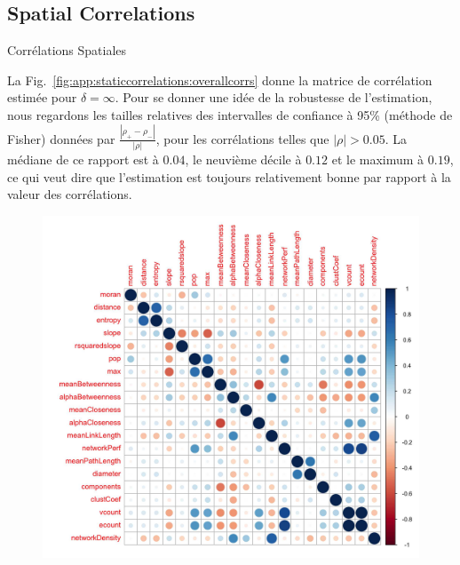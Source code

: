 \subsection{Spatial Correlations}{Corrélations Spatiales}


La Fig.~\ref{fig:app:staticcorrelations:overallcorrs} donne la matrice de corrélation estimée pour $\delta = \infty$. Pour se donner une idée de la robustesse de l'estimation, nous regardons les tailles relatives des intervalles de confiance à 95\% (méthode de Fisher) données par $\frac{\left|\rho_+ - \rho_-\right|}{\left|\rho\right|}$, pour les corrélations telles que $\left|\rho\right|>0.05$. La médiane de ce rapport est à $0.04$, le neuvième décile à $0.12$ et le maximum à $0.19$, ce qui veut dire que l'estimation est toujours relativement bonne par rapport à la valeur des corrélations.




\begin{figure}
	\includegraphics[width=\linewidth]{Figures/Final/A-staticcorrelations-overallcorrs.jpg}
\end{figure}






